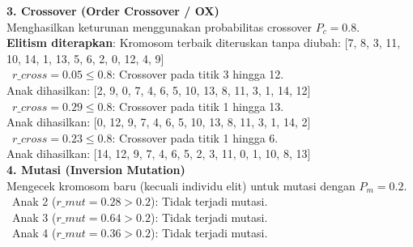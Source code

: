 \documentclass[12pt]{article}
\begin{document}
\vspace{0.5cm}
\noindent\textbf{3. Crossover (Order Crossover / OX)}\\Menghasilkan keturunan menggunakan probabilitas crossover $P_c = 0.8$.\\
\textbf{Elitism diterapkan}: Kromosom terbaik diteruskan tanpa diubah: [7, 8, 3, 11, 10, 14, 1, 13, 5, 6, 2, 0, 12, 4, 9]\\
\textbullet\ $r\_cross = 0.05 \le 0.8$: Crossover pada titik 3 hingga 12.\\ Anak dihasilkan: [2, 9, 0, 7, 4, 6, 5, 10, 13, 8, 11, 3, 1, 14, 12]\\
\textbullet\ $r\_cross = 0.29 \le 0.8$: Crossover pada titik 1 hingga 13.\\ Anak dihasilkan: [0, 12, 9, 7, 4, 6, 5, 10, 13, 8, 11, 3, 1, 14, 2]\\
\textbullet\ $r\_cross = 0.23 \le 0.8$: Crossover pada titik 1 hingga 6.\\ Anak dihasilkan: [14, 12, 9, 7, 4, 6, 5, 2, 3, 11, 0, 1, 10, 8, 13]\\

\vspace{0.5cm}
\noindent\textbf{4. Mutasi (Inversion Mutation)}\\Mengecek kromosom baru (kecuali individu elit) untuk mutasi dengan $P_m = 0.2$.\\
\textbullet\ Anak 2 ($r\_mut = 0.28 > 0.2$): Tidak terjadi mutasi.\\
\textbullet\ Anak 3 ($r\_mut = 0.64 > 0.2$): Tidak terjadi mutasi.\\
\textbullet\ Anak 4 ($r\_mut = 0.36 > 0.2$): Tidak terjadi mutasi.\\
\vspace{1cm}
\end{document}
